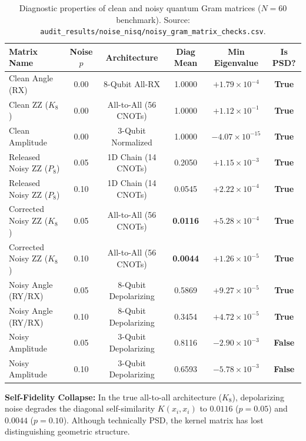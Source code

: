 \begin{table}[H]
\centering
\small
\caption{Diagnostic properties of clean and noisy quantum Gram matrices ($N=60$ benchmark). Source: \texttt{audit\_results/noise\_nisq/noisy\_gram\_matrix\_checks.csv}.}
\label{tab:noisy-gram-checks}
\begin{tabularx}{\textwidth}{lccccc}
\toprule
\textbf{Matrix Name} & \textbf{Noise $p$} & \textbf{Architecture} & \textbf{Diag Mean} & \textbf{Min Eigenvalue} & \textbf{Is PSD?} \\
\midrule
Clean Angle (RX) & 0.00 & 8-Qubit All-RX & 1.0000 & $+1.79 \times 10^{-4}$ & \textbf{True} \\
Clean ZZ ($K_8$) & 0.00 & All-to-All (56 CNOTs) & 1.0000 & $+1.12 \times 10^{-1}$ & \textbf{True} \\
Clean Amplitude & 0.00 & 3-Qubit Normalized & 1.0000 & $-4.07 \times 10^{-15}$ & \textbf{True} \\
\midrule
Released Noisy ZZ ($P_8$) & 0.05 & 1D Chain (14 CNOTs) & 0.2050 & $+1.15 \times 10^{-3}$ & \textbf{True} \\
Released Noisy ZZ ($P_8$) & 0.10 & 1D Chain (14 CNOTs) & 0.0545 & $+2.22 \times 10^{-4}$ & \textbf{True} \\
Corrected Noisy ZZ ($K_8$) & 0.05 & All-to-All (56 CNOTs) & \textbf{0.0116} & $+5.28 \times 10^{-4}$ & \textbf{True} \\
Corrected Noisy ZZ ($K_8$) & 0.10 & All-to-All (56 CNOTs) & \textbf{0.0044} & $+1.26 \times 10^{-5}$ & \textbf{True} \\
\midrule
Noisy Angle (RY/RX) & 0.05 & 8-Qubit Depolarizing & 0.5869 & $+9.27 \times 10^{-5}$ & \textbf{True} \\
Noisy Angle (RY/RX) & 0.10 & 8-Qubit Depolarizing & 0.3454 & $+4.72 \times 10^{-5}$ & \textbf{True} \\
Noisy Amplitude & 0.05 & 3-Qubit Depolarizing & 0.8116 & $-2.90 \times 10^{-3}$ & \textbf{False} \\
Noisy Amplitude & 0.10 & 3-Qubit Depolarizing & 0.6593 & $-5.78 \times 10^{-3}$ & \textbf{False} \\
\bottomrule
\end{tabularx}
\end{table}

\textbf{Self-Fidelity Collapse:} In the true all-to-all architecture ($K_8$), depolarizing noise degrades the diagonal self-similarity $K(x_i, x_i)$ to $0.0116$ ($p=0.05$) and $0.0044$ ($p=0.10$). Although technically PSD, the kernel matrix has lost distinguishing geometric structure.

